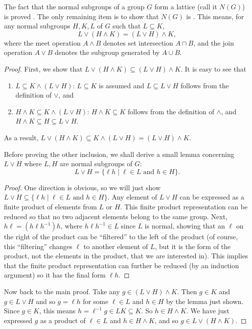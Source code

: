 \documentclass[12pt]{article}
\begin{document}
The fact that the normal subgroups of a group $G$ form a lattice (call it $N(G)$) is proved .  The only remaining item is to show that $N(G)$ is .  This means, for any normal subgroups $H,K,L$ of $G$ such that $L\subseteq K$, 
$$L\vee(H\wedge K)=(L\vee H)\wedge K,$$
where the meet operation $A\wedge B$ denotes set intersection $A\cap B$, and the join operation $A \vee B$ denotes the subgroup generated by $A\cup B$.
\begin{proof}
First, we show that $L\vee(H\wedge K)\subseteq (L\vee H)\wedge K$.  It is easy to see that 
\begin{enumerate}
\item $L\subseteq K\wedge(L\vee H)$: $L\subseteq K$ is assumed and $L\subseteq L\vee H$ follows from the definition of $\vee$, and
\item $H\wedge K \subseteq K\wedge(L\vee H)$: $H\wedge K\subseteq K$ follows from the definition of $\wedge$, and $H\wedge K\subseteq H\subseteq L\vee H$.  
\end{enumerate}
As a result, $L\vee(H\wedge K)\subseteq K\wedge(L\vee H)=(L\vee H)\wedge K$.

Before proving the other inclusion, we shall derive a small lemma concerning $L\vee H$ where $L,H$ are normal subgroups of $G$:
$$L\vee H=\lbrace \ell h\mid \ell\in L\mbox{ and }h\in H\rbrace.$$
\begin{proof}  One direction is obvious, so we will just show $L\vee H \subseteq \lbrace \ell h\mid \ell\in L\mbox{ and }h\in H\rbrace$.  Any element of $L\vee H$ can be expressed as a finite product of elements from $L$ or $H$.  This finite product representation can be reduced so that no two adjacent elements belong to the same group.  Next, $h\ell = (h\ell h^{-1})h$, where $h\ell h^{-1}\in L$ since $L$ is normal, showing that an $\ell$ on the right of the product can be ``filtered'' to the left of the product (of course, this ``filtering'' changes $\ell$ to another element of $L$, but it is the form of the product, not the elements in the product, that we are interested in).  This implies that the finite product representation can further be reduced (by an induction argument) so it has the final form $\ell h$.
\end{proof}

Now back to the main proof.  Take any $g\in (L\vee H)\wedge K$.  Then $g\in K$ and $g\in L\vee H$ and so $g=\ell h$ for some $\ell\in L$ and $h\in H$ by the lemma just shown.  Since $g\in K$, this means $h=\ell^{-1}g\in LK\subseteq K$.  So $h\in H\wedge K$.  We have just expressed $g$ as a product of $\ell\in L$ and $h\in H\wedge K$, and so $g\in L\vee (H\wedge K)$.
\end{proof}
\end{document}
